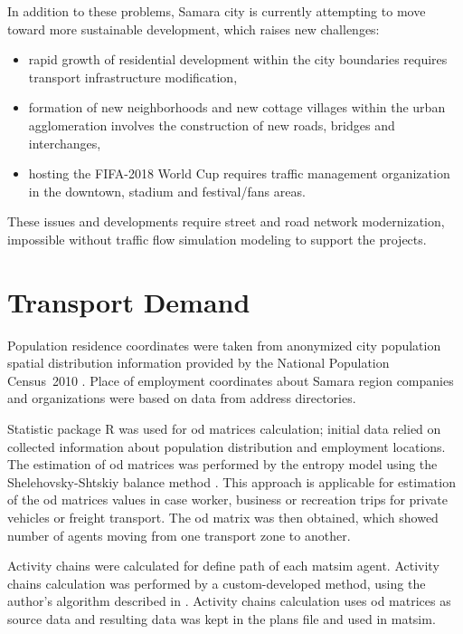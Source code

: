In addition to these problems, Samara city is currently attempting to move toward more sustainable development, which raises new challenges:
\begin{itemize}
\item rapid growth of residential development within the city boundaries requires transport infrastructure modification,
\item formation of new neighborhoods and new cottage villages within the urban agglomeration involves the construction of new roads, bridges and interchanges,
\item hosting the FIFA-2018 World Cup requires traffic management organization in the downtown, stadium and festival/fans areas.
\end{itemize}

These issues and developments require street and road network modernization, impossible without traffic flow simulation modeling to support the projects.

\section{Transport Demand}
Population residence coordinates were taken from anonymized city population spatial distribution information provided by the National Population Census~2010 \citep[][]{GKS_2010}. Place of employment coordinates about Samara region companies and organizations were based on data from address directories.

Statistic package R was used for \gls{od} matrices calculation; initial data relied on collected information about population distribution and employment locations. The estimation of \gls{od} matrices was performed by the entropy model using the Shelehovsky-Shtskiy balance method \citep[][]{Nurminski_2009, Autodor_2013, Shvetsov_2003}. This approach is applicable for estimation of the \gls{od} matrices values in case worker, business or recreation trips for private vehicles or freight transport. The \gls{od} matrix was then obtained, which showed number of agents moving from one transport zone to another.

Activity chains were calculated for define path of each \gls{matsim} agent. Activity chains calculation was performed by a custom-developed method, using the author's algorithm described in \citet[][]{SaprykinaEtAl_2012}. Activity chains calculation uses \gls{od} matrices as source data and resulting data was kept in the plans file and used in \gls{matsim}.

